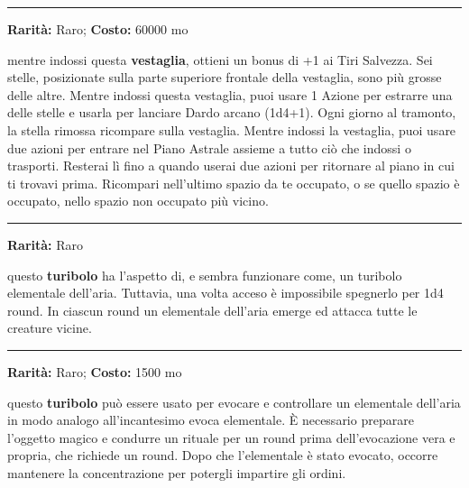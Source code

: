 \begin{multicols}{2}
\smallskip\noindent\rule{\linewidth}{2pt}  \hypertarget{TunicadelleStelle}{}\medskip{}\noindent\label{TunicadelleStelle}

\textbf{Rarità:} Raro; \textbf{Costo:} 60000 mo

mentre indossi questa \textbf{vestaglia}, ottieni un bonus di +1 ai Tiri Salvezza. Sei stelle, posizionate sulla parte superiore frontale della vestaglia, sono più grosse delle altre. Mentre indossi questa vestaglia, puoi usare 1 Azione per estrarre una delle stelle e usarla per lanciare Dardo arcano (1d4+1). Ogni giorno al tramonto, la stella rimossa ricompare sulla vestaglia. Mentre indossi la vestaglia, puoi usare due azioni per entrare nel Piano Astrale assieme a tutto ciò che indossi o trasporti. Resterai lì fino a quando userai due azioni per ritornare al piano in cui ti trovavi prima. Ricompari nell'ultimo spazio da te occupato, o se quello spazio è occupato, nello spazio non occupato più vicino.

\smallskip\noindent\rule{\linewidth}{2pt}  \hypertarget{Turibolodell'Evocazionemaledetta}{}\medskip{}\noindent\label{Turibolodell'Evocazionemaledetta}

\textbf{Rarità:} Raro

questo \textbf{turibolo} ha l'aspetto di, e sembra funzionare come, un turibolo elementale dell'aria. Tuttavia, una volta acceso è impossibile spegnerlo per 1d4 round. In ciascun round un elementale dell'aria emerge ed attacca tutte le creature vicine.

\smallskip\noindent\rule{\linewidth}{2pt}  \hypertarget{TuriboloElementaledell'aria}{}\medskip{}\noindent\label{TuriboloElementaledell'aria}

\textbf{Rarità:} Raro; \textbf{Costo:} 1500 mo

questo \textbf{turibolo} può essere usato per evocare e controllare un elementale dell'aria in modo analogo all'incantesimo evoca elementale. È necessario preparare l'oggetto magico e condurre un rituale per un round prima dell'evocazione vera e propria, che richiede un round. Dopo che l'elementale è stato evocato, occorre mantenere la concentrazione per potergli impartire gli ordini.


\end{multicols}
